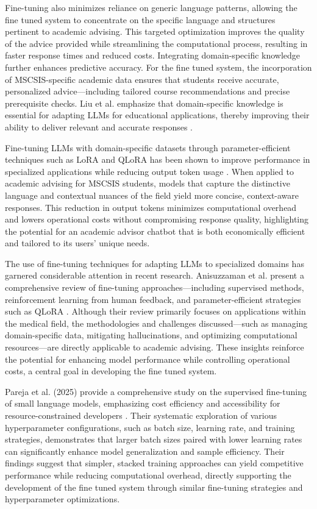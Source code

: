 \documentclass[12pt,oneside,openany]{report}
\begin{document}
Fine-tuning also minimizes reliance on generic language patterns, allowing the fine tuned system to concentrate on the specific language and structures pertinent to academic advising. This targeted optimization improves the quality of the advice provided while streamlining the computational process, resulting in faster response times and reduced costs. Integrating domain-specific knowledge further enhances predictive accuracy. For the fine tuned system, the incorporation of MSCSIS-specific academic data ensures that students receive accurate, personalized advice—including tailored course recommendations and precise prerequisite checks. Liu et al. emphasize that domain-specific knowledge is essential for adapting LLMs for educational applications, thereby improving their ability to deliver relevant and accurate responses \cite{Liu_2023}.

Fine-tuning LLMs with domain-specific datasets through parameter-efficient techniques such as LoRA and QLoRA has been shown to improve performance in specialized applications while reducing output token usage \cite{jeong2024fine}. When applied to academic advising for MSCSIS students, models that capture the distinctive language and contextual nuances of the field yield more concise, context-aware responses. This reduction in output tokens minimizes computational overhead and lowers operational costs without compromising response quality, highlighting the potential for an academic advisor chatbot that is both economically efficient and tailored to its users' unique needs.

The use of fine-tuning techniques for adapting LLMs to specialized domains has garnered considerable attention in recent research. Anisuzzaman et al. present a comprehensive review of fine-tuning approaches—including supervised methods, reinforcement learning from human feedback, and parameter-efficient strategies such as QLoRA \cite{anisuzzaman2024fine}. Although their review primarily focuses on applications within the medical field, the methodologies and challenges discussed—such as managing domain-specific data, mitigating hallucinations, and optimizing computational resources—are directly applicable to academic advising. These insights reinforce the potential for enhancing model performance while controlling operational costs, a central goal in developing the fine tuned system.

Pareja et al. (2025) provide a comprehensive study on the supervised fine-tuning of small language models, emphasizing cost efficiency and accessibility for resource-constrained developers \cite{pareja2024unveilingsecretrecipeguide}. Their systematic exploration of various hyperparameter configurations, such as batch size, learning rate, and training strategies, demonstrates that larger batch sizes paired with lower learning rates can significantly enhance model generalization and sample efficiency. Their findings suggest that simpler, stacked training approaches can yield competitive performance while reducing computational overhead, directly supporting the development of the fine tuned system through similar fine-tuning strategies and hyperparameter optimizations.
\end{document}
